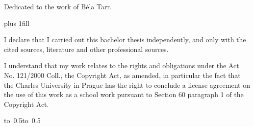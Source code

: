 \newpage



\openright

\noindent
Dedicated to the work of B\'ela Tarr.

\newpage


\vglue 0pt plus 1fill

\noindent
I declare that I carried out this bachelor thesis independently, and only with
the cited sources, literature and other professional sources.

\medskip\noindent
I understand that my work relates to the rights and obligations under the Act
No. 121/2000 Coll., the Copyright Act, as amended, in particular the fact that
the Charles University in Prague has the right to conclude a license agreement
on the use of this work as a school work pursuant to Section 60 paragraph 1 of
the Copyright Act.

\vspace{10mm}

\hbox{\hbox to 0.5\hbox to 0.5}

\vspace{20mm}
\newpage


